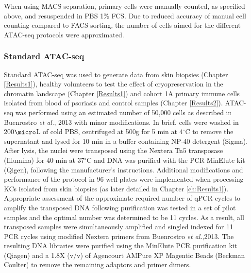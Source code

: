 When using MACS separation, primary cells were manually counted, as specified above, and resuspended in PBS 1\% FCS. Due to reduced accuracy of manual cell counting compared to FACS sorting, the number of cells aimed for the different ATAC-seq protocols were approximated.

\subsubsection{Standard ATAC-seq}

Standard ATAC-seq was used to generate data from skin biopsies (Chapter \ref{Results1}), healthy volunteers to test the effect of cryopreservation in the chromatin landscape (Chapter \ref{Results1}) and cohort 1A primary immune cells isolated from blood of psoriasis and control samples (Chapter \ref{Results2}). ATAC-seq was performed using an estimated number of 50,000 cells as described in Buenrostro \textit{et al.}, 2013 with minor modifications. In brief, cells were washed in 200$\micro$L of cold PBS, centrifuged at 500g for 5 min at 4$^\circ$C to remove the supernatant and lysed for 10 min in a buffer containing NP-40 detergent (Sigma). After lysis, the nuclei were transposed using the Nextera Tn5 transposase (Illumina) for 40 min at 37{$^\circ$}C and DNA was purified with the PCR MinElute kit (Qigen), following the manufacturer's instructions. Additional modifications and performance of the protocol in 96-well plates were implemented when processing KCs isolated from skin biopsies (as later detailed in Chapter \ref{ch:Results1}). Appropriate assessment of the approximate required number of qPCR cycles to amplify the transposed DNA following purification was tested in a set of pilot samples and the optimal number was determined to be 11 cycles. As a result, all transposed samples were simultaneously amplified and singled indexed for 11 PCR cycles using modified Nextera primers from Buenrostro \textit{et al.},2013. The resulting DNA libraries were purified using the MinElute PCR purification kit (Qiagen) and a 1.8X (v/v) of Agencourt AMPure XP Magentic Beads (Beckman Coulter) to remove the remaining adaptors and primer dimers.

